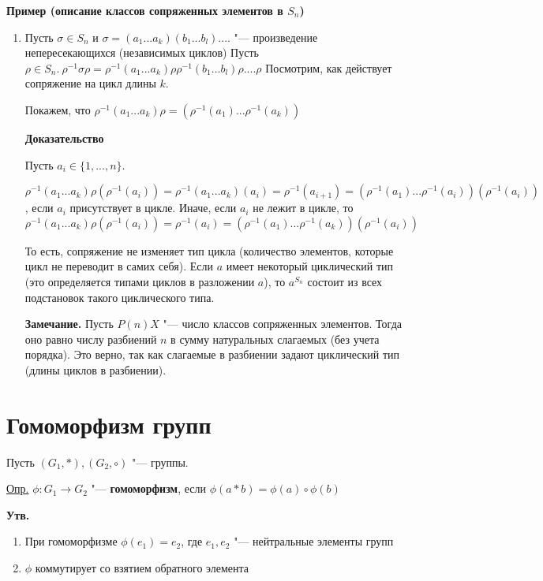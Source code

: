 \documentclass{article}
\begin{document}
\textbf{Пример (описание классов сопряженных элементов в $S_n$)}
\begin{enumerate}
	\item Пусть $\sigma \in S_n$ и $\sigma = (a_1 ... a_k)(b_1 ... b_l) .... $ "--- произведение непересекающихся (независимых циклов)
	Пусть $\rho \in S_n. \  \rho^{-1} \sigma \rho = \rho^{-1}(a_1 ... a_k)\rho\rho^{-1}(b_1 ... b_l)\rho .... \rho$	
	Посмотрим, как действует сопряжение на цикл длины $k$.
	
	Покажем, что $\rho^{-1}(a_1 ... a_k)\rho = (\rho^{-1}(a_1) ... \rho^{-1}(a_k))$
	
	\textbf{Доказательство}
	
	Пусть $a_i \in \{1, ..., n\}$.
	
	$\rho^{-1}(a_1 ... a_k)\rho(\rho^{-1}(a_i)) = \rho^{-1}(a_1 ... a_k)(a_i) = \rho^{-1}(a_{i+1}) = (\rho^{-1}(a_1) ... \rho^{-1}(a_i))(\rho^{-1}(a_i))$, если $a_i$ присутствует в цикле. Иначе, если $a_i$ не лежит в цикле, то $\rho^{-1}(a_1 ... a_k)\rho(\rho^{-1}(a_i)) = \rho^{-1}(a_i) = (\rho^{-1}(a_1) ... \rho^{-1}(a_k))(\rho^{-1}(a_i))$
	
	То есть, сопряжение не изменяет тип цикла (количество элементов, которые цикл не переводит в самих себя). Если $a$ имеет некоторый циклический тип (это определяется типами циклов в разложении $a$), то $a^{S_n}$ состоит из всех подстановок такого циклического типа.
	
	\textbf{Замечание.}
	Пусть $P(n)X$ "--- число классов сопряженных элементов. Тогда оно равно числу разбиений $n$ в сумму натуральных слагаемых (без учета порядка). Это верно, так как слагаемые в разбиении задают циклический тип (длины циклов в разбиении).
\end{enumerate}

\section{Гомоморфизм групп}

Пусть $(G_1, *), (G_2, \circ)$ "--- группы.

\underline{Опр.} $\phi : G_1 \rightarrow G_2$ "--- \textbf{гомоморфизм}, если $\phi(a*b) = \phi(a) \circ \phi(b)$

\textbf{Утв.}
\begin{enumerate}
	\item При гомоморфизме $\phi(e_1) = e_2$, где $e_1, e_2$ "--- нейтральные элементы групп
	\item $\phi$ коммутирует со взятием обратного элемента
\end{enumerate}
\end{document}
